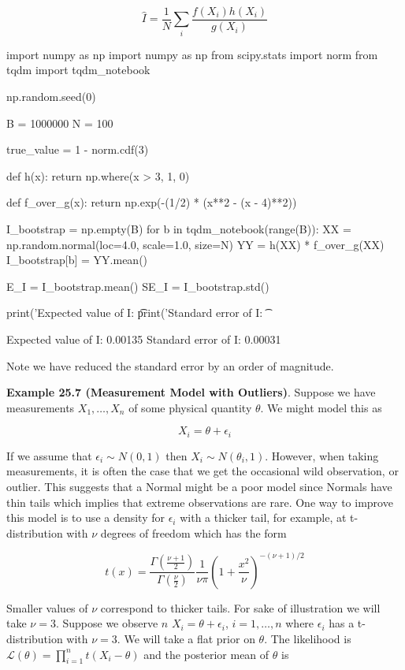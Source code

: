 \[ \hat{I} = \frac{1}{N} \sum_{i} \frac{f(X_{i}) h(X_{i})}{g(X_{i})} \]

\begin{python}
import numpy as np
import numpy as np
from scipy.stats import norm
from tqdm import tqdm_{n}otebook

np.random.seed(0)

B = 1000000
N = 100

true_value = 1 - norm.cdf(3)

def h(x):
    return np.where(x > 3, 1, 0)

def f_over_g(x):
    return np.exp(-(1/2) * (x**2 - (x - 4)**2))

I_bootstrap = np.empty(B)
for b in tqdm_{n}otebook(range(B)):
    XX = np.random.normal(loc=4.0, scale=1.0, size=N)
    YY = h(XX) * f_over_g(XX)
    I_bootstrap[b] = YY.mean()

E_I = I_bootstrap.mean()
SE_I = I_bootstrap.std()

print('Expected value of I: \t %
print('Standard error of I: \t %
\end{python}


\begin{console}
Expected value of I:     0.00135
Standard error of I:     0.00031
\end{console}

Note we have reduced the standard error by an order of magnitude.

\textbf{Example 25.7 (Measurement Model with Outliers)}. Suppose we have
measurements \(X_{1}, \dots, X_{n}\) of some physical quantity \(\theta\).
We might model this as

\[ X_{i} = \theta + \epsilon_{i} \]

If we assume that \(\epsilon_{i} \sim N(0, 1)\) then
\(X_{i} \sim N(\theta_{i}, 1)\). However, when taking measurements, it is
often the case that we get the occasional wild observation, or outlier.
This suggests that a Normal might be a poor model since Normals have
thin tails which implies that extreme observations are rare. One way to
improve this model is to use a density for \(\epsilon_{i}\) with a thicker
tail, for example, at t-distribution with \(\nu\) degrees of freedom
which has the form

\[ t(x) = \frac{\Gamma\left( \frac{\nu + 1}{2} \right)}{\Gamma \left( \frac{\nu}{2} \right)} \frac{1}{\nu \pi} \left( 1 + \frac{x^{2}}{\nu} \right)^{-(\nu + 1) / 2}\]

Smaller values of \(\nu\) correspond to thicker tails. For sake of
illustration we will take \(\nu = 3\). Suppose we observe \(n\)
\(X_{i} = \theta + \epsilon_{i}\), \(i = 1, \dots, n\) where \(\epsilon_{i}\)
has a t-distribution with \(\nu = 3\). We will take a flat prior on
\(\theta\). The likelihood is
\(\mathcal{L}(\theta) = \prod_{i=1}^{n} t(X_{i} - \theta)\) and the
posterior mean of \(\theta\) is

